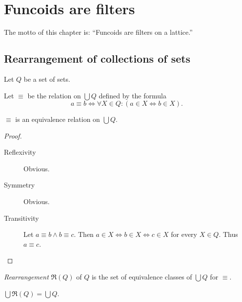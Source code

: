 
\chapter{Funcoids are filters}

The motto of this chapter is: ``Funcoids are filters on a lattice.''


\section{Rearrangement of collections of sets}

Let $Q$ be a set of sets.

Let $\equiv$ be the relation on $\bigcup Q$ defined by the formula
\[
a\equiv b\Leftrightarrow\forall X\in Q:(a\in X\Leftrightarrow b\in X).
\]

\begin{prop}
$\equiv$ is an equivalence relation on $\bigcup Q$.\end{prop}
\begin{proof}
~
\begin{description}
\item [{Reflexivity}] Obvious.
\item [{Symmetry}] Obvious.
\item [{Transitivity}] Let $a\equiv b\wedge b\equiv c$. Then $a\in X\Leftrightarrow b\in X\Leftrightarrow c\in X$
for every $X\in Q$. Thus $a\equiv c$.
\end{description}
\end{proof}
\begin{defn}
\emph{Rearrangement} $\mathfrak{R}(Q)$ of $Q$ is the set of equivalence
classes of $\bigcup Q$ for $\equiv$.\end{defn}
\begin{obvious}
$\bigcup\mathfrak{R}(Q)=\bigcup Q$.
\end{obvious}

